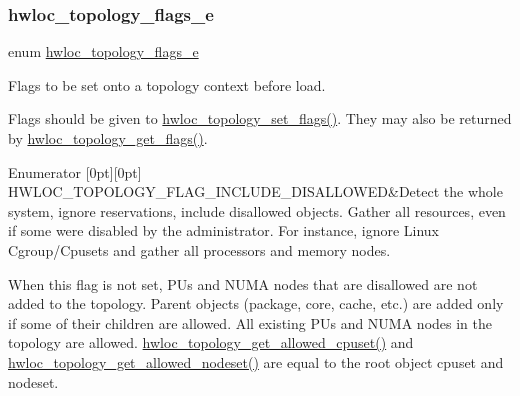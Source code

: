 \subsubsection{\texorpdfstring{hwloc\+\_\+topology\+\_\+flags\+\_\+e}{hwloc\_topology\_flags\_e}}
{\footnotesize\ttfamily enum \hyperlink{a00193_gada025d3ec20b4b420f8038d23d6e7bde}{hwloc\+\_\+topology\+\_\+flags\+\_\+e}}



Flags to be set onto a topology context before load. 

Flags should be given to \hyperlink{a00193_gaaeed4df656979e5f16befea9d29b814b}{hwloc\+\_\+topology\+\_\+set\+\_\+flags()}. They may also be returned by \hyperlink{a00193_ga09318f81c1d4713be907d64748a6f93c}{hwloc\+\_\+topology\+\_\+get\+\_\+flags()}. \begin{DoxyEnumFields}{Enumerator}
[0pt][0pt]{}\mbox{\label{a00193_ggada025d3ec20b4b420f8038d23d6e7bdea10907044bbb306fd0dc76acf046d9258}} 
H\+W\+L\+O\+C\+\_\+\+T\+O\+P\+O\+L\+O\+G\+Y\+\_\+\+F\+L\+A\+G\+\_\+\+I\+N\+C\+L\+U\+D\+E\+\_\+\+D\+I\+S\+A\+L\+L\+O\+W\+ED&Detect the whole system, ignore reservations, include disallowed objects. Gather all resources, even if some were disabled by the administrator. For instance, ignore Linux Cgroup/\+Cpusets and gather all processors and memory nodes.

When this flag is not set, P\+Us and N\+U\+MA nodes that are disallowed are not added to the topology. Parent objects (package, core, cache, etc.) are added only if some of their children are allowed. All existing P\+Us and N\+U\+MA nodes in the topology are allowed. \hyperlink{a00202_ga517d5d68ec9f24583d8933aab713be8e}{hwloc\+\_\+topology\+\_\+get\+\_\+allowed\+\_\+cpuset()} and \hyperlink{a00202_ga21a4d7237a11e76b912ed4524ab78cbd}{hwloc\+\_\+topology\+\_\+get\+\_\+allowed\+\_\+nodeset()} are equal to the root object cpuset and nodeset.


\end{DoxyEnumFields}
